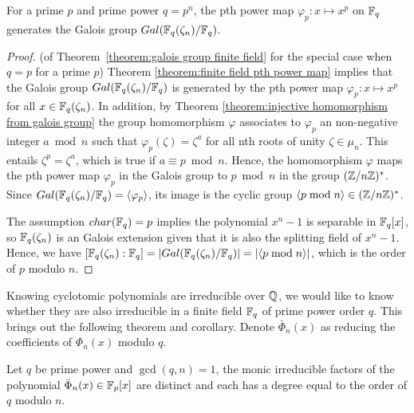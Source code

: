 \documentclass[../main.tex]{subfiles}
\begin{document}
\begin{theorem}
\label{theorem:finite field pth power map}
For a prime $p$ and prime power $q=p^n$, the pth power map\reversemarginpar
{}
 $\varphi_p:x \mapsto x^p$ on $\mathbb{F}_q$ generates the Galois group $Gal(\mathbb{F}_q(\zeta_n)/\mathbb{F}_q)$. 
\end{theorem}


\begin{proof} (of Theorem~\ref{theorem:galois group finite field} for the special case when $q = p$ for a prime $p$)
Theorem \ref{theorem:finite field pth power map} implies that the Galois group $Gal(\mathbb{F}_q(\zeta_n)/\mathbb{F}_q)$ is generated by the pth power map $\varphi_p: x \mapsto x^p$ for all $x \in \mathbb{F}_q(\zeta_n)$. In addition, by Theorem \ref{theorem:injective homomorphism from galois group} the group homomorphism $\varphi$ associates to $\varphi_p$ an non-negative integer $a \bmod n$ such that $\varphi_p(\zeta) = \zeta^a$ for all nth roots of unity $\zeta \in \mu_n$. This entails $\zeta^p = \zeta^a$, which is true if $a \equiv p \bmod n$. Hence, the homomorphism $\varphi$ maps the pth power map $\varphi_p$ in the Galois group to $p \bmod n$ in the group $(\mathbb{Z}/n\mathbb{Z})^*$. Since $Gal(\mathbb{F}_q(\zeta_n) / \mathbb{F}_q) = \langle \varphi_p \rangle$, its image is the cyclic group $\langle p \bmod n \rangle \in (\mathbb{Z}/n\mathbb{Z})^*$.

The assumption $char(\mathbb{F}_q)=p$ implies the polynomial $x^n-1$ is separable in $\mathbb{F}_q[x]$, so $\mathbb{F}_q(\zeta_n)$ is an Galois extension given that it is also the splitting field of $x^n-1$. Hence, we have $[\mathbb{F}_q(\zeta_n): \mathbb{F}_q]=|Gal(\mathbb{F}_q(\zeta_n) / \mathbb{F}_q)|=|\langle p \bmod n \rangle|$, which is the order of $p$ modulo $n$.
\end{proof}

Knowing cyclotomic polynomials are irreducible over $\mathbb{Q}$, we would like to know whether they are also irreducible in a finite field $\mathbb{F}_q$ of prime power order $q$. This brings out the following theorem and corollary. Denote $\bar{\Phi}_n(x)$ as reducing the coefficients of $\Phi_n(x)$ modulo $q$. 

\begin{theorem}
\label{thm:splitCycPoly}
\reversemarginpar
{}
Let $q$ be prime power and $\gcd(q,n)=1$, the monic irreducible factors of the polynomial $\bar{\Phi}_n(x) \in \mathbb{F}_p[x]$ are distinct and each has a degree equal to the order of $q$ modulo $n$. 
\end{theorem}
\end{document}
